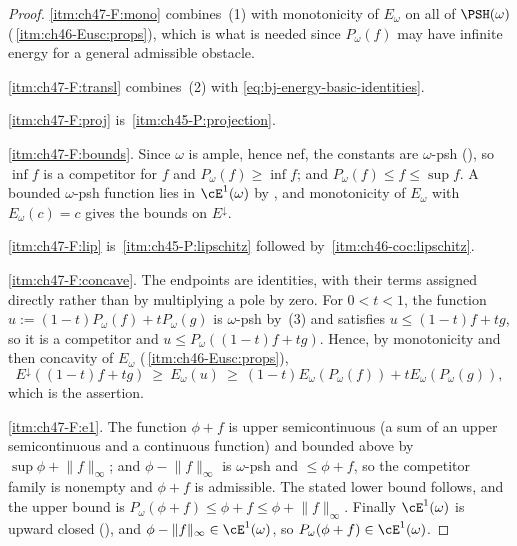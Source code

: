 \begin{proof}
\cref{itm:ch47-F:mono} combines
\,(1) with monotonicity of
$E_\omega$ on all of $\PSH(\omega)$
(\,\cref{itm:ch46-Eusc:props}), which is what is
needed since $P_\omega(f)$ may have infinite energy for a general
admissible obstacle.

\cref{itm:ch47-F:transl} combines
\,(2) with
\eqref{eq:bj-energy-basic-identities}.

\cref{itm:ch47-F:proj} is
\,\cref{itm:ch45-P:projection}.

\cref{itm:ch47-F:bounds}.  Since $\omega$ is ample, hence nef, the
constants are $\omega$-psh (), so
$\inf f$ is a competitor for $f$ and $P_\omega(f)\ge\inf f$; and
$P_\omega(f)\le f\le\sup f$.  A bounded $\omega$-psh function lies in
$\cE^1(\omega)$ by , and monotonicity of
$E_\omega$ with $E_\omega(c)=c$ gives the bounds on $E^\downarrow$.

\cref{itm:ch47-F:lip} is
\,\cref{itm:ch45-P:lipschitz} followed
by \,\cref{itm:ch46-coc:lipschitz}.

\cref{itm:ch47-F:concave}. The endpoints are identities, with their
terms assigned directly rather than by multiplying a pole by zero.
For $0<t<1$, the function
$u:=(1-t)P_\omega(f)+tP_\omega(g)$ is $\omega$-psh by
\,(3) and satisfies $u\le(1-t)f+tg$, so it is
a competitor and $u\le P_\omega((1-t)f+tg)$.  Hence, by monotonicity and
then concavity of $E_\omega$
(\,\cref{itm:ch46-Eusc:props}),
\[
 E^\downarrow((1-t)f+tg)\ \ge\ E_\omega(u)\ \ge\
 (1-t)E_\omega(P_\omega(f))+tE_\omega(P_\omega(g)),
\]
which is the assertion.

\cref{itm:ch47-F:e1}.  The function $\phi+f$ is upper semicontinuous
(a sum of an upper semicontinuous and a continuous function) and bounded
above by $\sup\phi+\lVert f\rVert_\infty$; and
$\phi-\lVert f\rVert_\infty$ is $\omega$-psh and $\le\phi+f$, so the
competitor family is nonempty and $\phi+f$ is admissible.  The stated
lower bound follows, and the upper bound is
$P_\omega(\phi+f)\le\phi+f\le\phi+\lVert f\rVert_\infty$.  Finally
$\cE^1(\omega)$ is upward closed (\Cref{thm:bj-e1-basic}), and
$\phi-\lVert f\rVert_\infty\in\cE^1(\omega)$, so
$P_\omega(\phi+f)\in\cE^1(\omega)$.
\end{proof}

